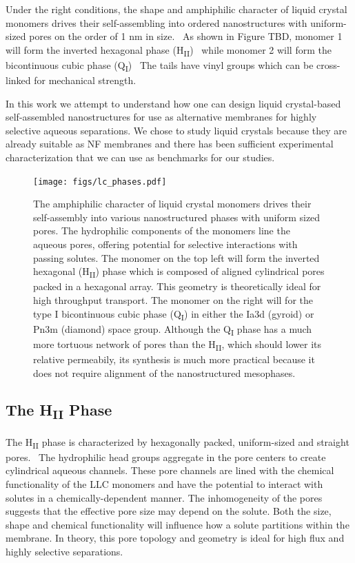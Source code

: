   Under the right conditions, the shape and amphiphilic character of liquid 
  crystal monomers drives their self-assembling into ordered nanostructures with
  uniform-sized pores on the order of 1 nm in size.~\cite{gin_polymerized_2008}
  As shown in Figure TBD, monomer 1 will form the inverted hexagonal phase 
  (H\textsubscript{II})~\cite{smith_ordered_1997} while monomer 2 will form the 
  bicontinuous cubic phase (Q\textsubscript{I})~\cite{carter_glycerol-based_2012}
  The tails have vinyl groups which can be cross-linked for mechanical strength.

  In this work we attempt to understand how one can design liquid crystal-based
  self-assembled nanostructures for use as alternative membranes for highly selective 
  aqueous separations. We chose to study liquid crystals because they are already 
  suitable as NF membranes and there has been sufficient experimental 
  characterization that we can use as benchmarks for our studies.~\cite{gin_polymerized_2001,feng_scalable_2014,feng_thin_2016}
  
  \begin{figure}
  \centering
  \texttt{[image: figs/lc\_phases.pdf]}
  \caption{The amphiphilic character of liquid crystal monomers drives their
  self-assembly into various nanostructured phases with uniform sized pores. 
  The hydrophilic components of the monomers line the aqueous pores, offering
  potential for selective interactions with passing solutes. The monomer on 
  the top left will form the inverted hexagonal (H\textsubscript{II})
  phase which is composed of aligned cylindrical pores packed in a hexagonal 
  array. This geometry is theoretically ideal for high throughput transport. 
  The monomer on the right will for the type I bicontinuous cubic phase
  (Q\textsubscript{I}) in either the Ia3d (gyroid) or Pn3m (diamond) space group.
  Although the Q\textsubscript{I} phase has a much more tortuous network of 
  pores than the H\textsubscript{II}, which should lower its relative permeabily,
  its synthesis is much more practical because it does not require alignment of
  the nanostructured mesophases.
  }\label{fig:lc_phases}
  \end{figure}

  \subsection{The H\textsubscript{II} Phase}
   
  The H\textsubscript{II} phase is characterized by hexagonally packed, uniform-sized
  and straight pores.~\cite{smith_ordered_1997} The hydrophilic head groups aggregate
  in the pore centers to create cylindrical aqueous channels. These pore channels are
  lined with the chemical functionality of the LLC monomers and have the potential to
  interact with solutes in a chemically-dependent manner. The inhomogeneity of the 
  pores suggests that the effective pore size may depend on the solute. Both the size,
  shape and chemical functionality will influence how a solute partitions within the 
  membrane. In theory, this pore topology and geometry is ideal for high flux and 
  highly selective separations.
  
